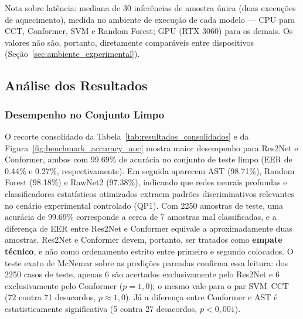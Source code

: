\documentclass[12pt,a4paper]{article}
\begin{document}


\noindent\footnotesize{Nota sobre latência: mediana de \num{30} inferências de
amostra única (duas execuções de aquecimento), medida no ambiente de execução
de cada modelo --- CPU para CCT, Conformer, SVM e Random Forest; GPU
(RTX 3060) para os demais. Os valores não são, portanto, diretamente
comparáveis entre dispositivos
(Seção~\ref{sec:ambiente_experimental}).}\normalsize

\subsection{Análise dos Resultados}
\label{sec:analise_resultados}

\subsubsection*{Desempenho no Conjunto Limpo}

O recorte consolidado da Tabela~\ref{tab:resultados_consolidados} e da
Figura~\ref{fig:benchmark_accuracy_auc} mostra maior desempenho para Res2Net e
Conformer, ambos com \num{99,69}\% de acurácia no conjunto de teste limpo (EER
de \num{0,44}\% e \num{0,27}\%, respectivamente). Em seguida aparecem AST
(\num{98,71}\%), Random Forest (\num{98,18}\%) e RawNet2 (\num{97,38}\%),
indicando que redes neurais profundas e classificadores estatísticos otimizados
extraem padrões discriminativos relevantes no cenário experimental controlado
(QP1). Com \num[group-minimum-digits=4]{2250} amostras de teste, uma acurácia de \num{99,69}\%
corresponde a cerca de \num{7} amostras mal classificadas, e a diferença de EER
entre Res2Net e Conformer equivale a aproximadamente duas amostras. Res2Net e
Conformer devem, portanto, ser tratados como \textbf{empate técnico}, e não
como ordenamento estrito entre primeiro e segundo colocados. O teste exato de
McNemar sobre as predições pareadas confirma essa leitura: dos \num[group-minimum-digits=4]{2250}
casos de teste, apenas \num{6} são acertados exclusivamente pelo Res2Net e
\num{6} exclusivamente pelo Conformer ($p = 1{,}0$); o mesmo vale para o par
SVM--CCT (\num{72} contra \num{71} desacordos, $p \approx 1{,}0$). Já a
diferença entre Conformer e AST é estatisticamente significativa (\num{5}
contra \num{27} desacordos, $p < 0{,}001$).
\end{document}
